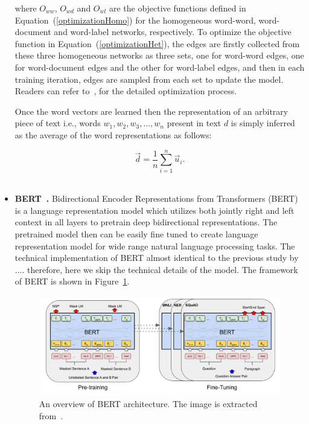 \begin{itemize}
where ${O}_{ww}$, ${O}_{wd}$ and ${O}_{wl}$ are the objective functions defined in Equation~(\ref{optimizationHomo}) for the homogeneous word-word, word-document and word-label networks, respectively. 
To optimize the objective function in Equation~(\ref{optimizationHet}), the edges are firstly collected from these three homogeneous networks as three sets, one for word-word edges, one for word-document edges and the other for word-label edges, and then in each training iteration, edges are sampled from each set to update the model. Readers can refer to~\cite{PTE,LINE}, for the detailed optimization process.

Once the word vectors are learned then the  representation of an arbitrary piece of text i.e., words $w_1, w_2, w_3,..., w_n$ present in text $d$ is simply inferred as the average of the word representations as follows:

\begin{equation}
\vec d= \frac{1}{n}\sum_{i=1}^{n}\vec u_{i}.
\end{equation}
\\
\item \textbf{BERT~\cite{DBLP:conf/naacl/DevlinCLT19}.} Bidirectional Encoder Representations from Transformers (BERT) is a language representation model which utilizes both jointly right and left context in all layers to pretrain deep bidirectional representations. The pretrained model then can be easily fine tuned to create language representation model for wide range natural language processing tasks. The technical implementation of BERT almost identical to the previous study by .... therefore, here we skip the technical details of the model.
The framework of BERT is shown in Figure~\ref{fig:bert}.
\vspace{0.3cm}
\begin{figure}[h]
\centering
 \includegraphics[width=\linewidth]{Figures/fig_BERT.png}
 \caption{An overview of BERT architecture. The image is extracted from~\protect\cite{DBLP:conf/naacl/DevlinCLT19}.}
 \label{fig:bert}
\end{figure} 


\end{itemize}
